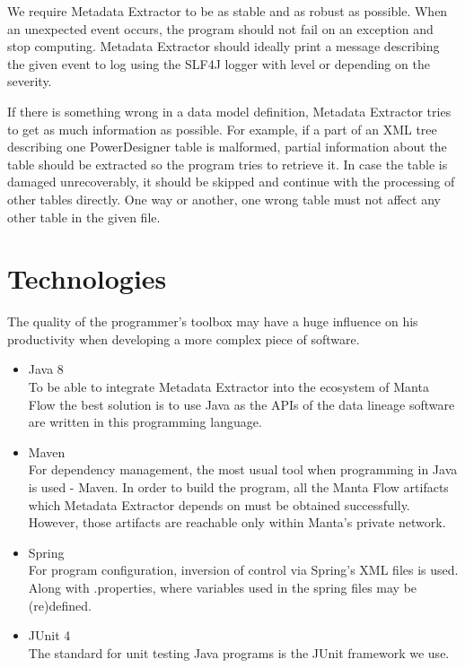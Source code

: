 We require Metadata Extractor to be as stable and as robust as possible. 
When an unexpected event occurs, the program should not fail on an exception and stop computing. Metadata Extractor should ideally print a message describing the given event to log using the SLF4J logger with level  or  depending on the severity. 

If there is something wrong in a data model definition, Metadata Extractor tries to get as much information as possible.
For example, if a part of an XML tree describing one PowerDesigner table is malformed, partial information about the table should be extracted so the program tries to retrieve it. In case the table is damaged unrecoverably, it should be skipped and continue with the processing of other tables directly. 
One way or another, one wrong table must not affect any other table in the given file.

\section{Technologies}

The quality of the programmer's toolbox may have a huge influence on his productivity when developing a more complex piece of software.

\begin{itemize}
	\item Java 8 \\
	To be able to integrate Metadata Extractor into the ecosystem of Manta Flow the best solution is to use Java as the APIs of the data lineage software are written in this programming language.
	\item Maven \\ 
	For dependency management, the most usual tool when programming in Java is used - Maven. In order to build the program, all the Manta Flow artifacts which Metadata Extractor depends on must be obtained successfully. However, those artifacts are reachable only within Manta's private network.
	\item Spring \\
	For program configuration, inversion of control via Spring's XML files is used. Along with .properties, where variables used in the spring files may be (re)defined.
	\item JUnit 4 \\ 
	The standard for unit testing Java programs is the JUnit framework we use.
\end{itemize}

